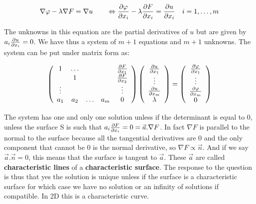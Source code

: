 \begin{equation}
\nabla \varphi - \lambda \nabla F = \nabla u \qquad \Leftrightarrow \frac{\partial \varphi}{\partial x_i } - \lambda \frac{\partial F}{\partial x_i } = \frac{\partial u}{\partial x_i} \quad i = 1,\dots, m
\end{equation} 

The unknowns in this equation are the partial derivatives of $u$ but are given by $a_i \frac{\partial u}{\partial x_i} = 0$. We have thus a system of $m+1$ equations and $m+1$ unknowns. The system can be put under matrix form as:

\begin{equation}
\left(
\begin{array}{ccccc}
1 & \dots & & & \frac{\partial F}{\partial x_1} \\
 & 1 &  & & \frac{\partial F}{\partial x_2}\\
 \vdots & & & & \vdots \\
 a_1 & a_2 & \dots & a_m & 0
\end{array}
\right)
\left(
\begin{array}{c}
\frac{\partial u}{\partial x_1}\\
\vdots\\
\frac{\partial u}{\partial x_m}\\
\lambda
\end{array}
\right)
=
\left(
\begin{array}{c}
\frac{\partial \varphi}{\partial x_1}\\
\vdots\\
\frac{\partial \varphi}{\partial x_m}\\
0
\end{array}
\right)
\end{equation}

The system has one and only one solution unless if the determinant is equal to 0, unless the surface S is such that $a_i \frac{\partial F}{\partial x_i} = 0 = \vec{a}.\nabla F$. In fact $\nabla F$ is parallel to the normal to the surface because all the tangential derivatives are 0 and the only component that cannot be 0 is the normal derivative, so $\nabla F \propto \vec{n}$. And if we say $\vec{a}.\vec{n} = 0$,
this means that the surface is tangent to $\vec{a}$. These $\vec{a}$ are called \textbf{characteristic lines} of a \textbf{characteristic surface}. The response to the question is thus that yes the solution is unique unless if the surface is a characteristic surface for which case we have no solution or an infinity of solutions if compatible. In 2D this is a characteristic curve. \\

